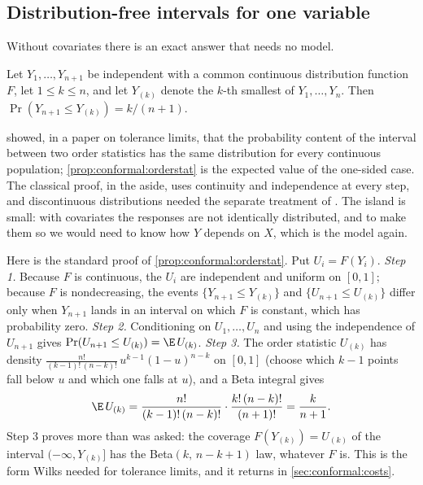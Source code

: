 \begin{refsection}
\subsection{Distribution-free intervals for one variable}\label{sec:conformal:wilks}

Without covariates there is an exact answer that needs no model.

\begin{proposition}\label{prop:conformal:orderstat}
Let $Y_1,\dots,Y_{n+1}$ be independent with a common continuous distribution function $F$, let $1\le k\le n$, and let $Y_{(k)}$ denote the $k$-th smallest of $Y_1,\dots,Y_n$. Then $\Pr(Y_{n+1}\le Y_{(k)})=k/(n+1)$.
\end{proposition}

\textcite{Wilks1941} showed, in a paper on tolerance limits, that the probability content of the interval between two order statistics has the same distribution for every continuous population; \cref{prop:conformal:orderstat} is the expected value of the one-sided case. The classical proof, in the aside, uses continuity and independence at every step, and discontinuous distributions needed the separate treatment of \textcite{ScheffeTukey1945}. The island is small: with covariates the responses are not identically distributed, and to make them so we would need to know how $Y$ depends on $X$, which is the model again.

\begin{aside}
Here is the standard proof of \cref{prop:conformal:orderstat}. Put $U_i=F(Y_i)$. \emph{Step 1.} Because $F$ is continuous, the $U_i$ are independent and uniform on $[0,1]$; because $F$ is nondecreasing, the events $\{Y_{n+1}\le Y_{(k)}\}$ and $\{U_{n+1}\le U_{(k)}\}$ differ only when $Y_{n+1}$ lands in an interval on which $F$ is constant, which has probability zero. \emph{Step 2.} Conditioning on $U_1,\dots,U_n$ and using the independence of $U_{n+1}$ gives $\Pr(U_{n+1}\le U_{(k)})=\E\,U_{(k)}$. \emph{Step 3.} The order statistic $U_{(k)}$ has density $\frac{n!}{(k-1)!\,(n-k)!}\,u^{k-1}(1-u)^{n-k}$ on $[0,1]$ (choose which $k-1$ points fall below $u$ and which one falls at $u$), and a Beta integral gives
\[
\E\,U_{(k)}=\frac{n!}{(k-1)!\,(n-k)!}\cdot\frac{k!\,(n-k)!}{(n+1)!}=\frac{k}{n+1}.
\]
Step 3 proves more than was asked: the coverage $F(Y_{(k)})=U_{(k)}$ of the interval $(-\infty,Y_{(k)}]$ has the Beta$(k,\,n-k+1)$ law, whatever $F$ is. This is the form Wilks needed for tolerance limits, and it returns in \cref{sec:conformal:costs}.
\end{aside}


\end{refsection}
